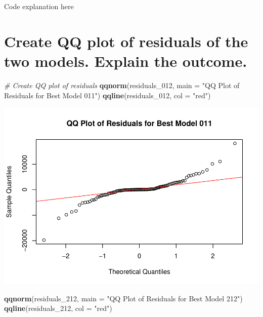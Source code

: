 \documentclass[
]{book}
\newenvironment{Shaded}{\begin{snugshade}}{\end{snugshade}}
\newcommand{\AttributeTok}[1]{\textcolor[rgb]{0.13,0.29,0.53}{#1}}
\newcommand{\CommentTok}[1]{\textcolor[rgb]{0.56,0.35,0.01}{\textit{#1}}}
\newcommand{\FunctionTok}[1]{\textcolor[rgb]{0.13,0.29,0.53}{\textbf{#1}}}
\newcommand{\NormalTok}[1]{#1}
\newcommand{\StringTok}[1]{\textcolor[rgb]{0.31,0.60,0.02}{#1}}
\begin{document}
Code explanation here

\section{Create QQ plot of residuals of the two models. Explain the outcome.}\label{create-qq-plot-of-residuals-of-the-two-models.-explain-the-outcome.}

\begin{Shaded}
\begin{Highlighting}[]
\CommentTok{\# Create QQ plot of residuals}
\FunctionTok{qqnorm}\NormalTok{(residuals\_012, }\AttributeTok{main =} \StringTok{"QQ Plot of Residuals for Best Model 011"}\NormalTok{)}
\FunctionTok{qqline}\NormalTok{(residuals\_012, }\AttributeTok{col =} \StringTok{"red"}\NormalTok{)}
\end{Highlighting}
\end{Shaded}

\includegraphics{bookdown-demo_files/figure-latex/unnamed-chunk-51-1.pdf}

\begin{Shaded}
\begin{Highlighting}[]
\FunctionTok{qqnorm}\NormalTok{(residuals\_212, }\AttributeTok{main =} \StringTok{"QQ Plot of Residuals for Best Model 212"}\NormalTok{)}
\FunctionTok{qqline}\NormalTok{(residuals\_212, }\AttributeTok{col =} \StringTok{"red"}\NormalTok{)}
\end{Highlighting}
\end{Shaded}
\end{document}
